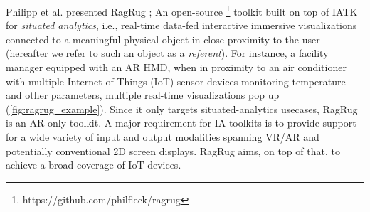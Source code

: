 \documentclass{vgtc}                          %
\begin{document}
Philipp et al. presented RagRug \cite{ragrug_toolkit}; An open-source
\footnote{https://github.com/philfleck/ragrug} toolkit built on top of IATK
for \textit{situated analytics}, i.e., real-time data-fed interactive immersive
visualizations connected to a meaningful physical object in close proximity to
the user (hereafter we refer to such an object as a \textit{referent}).
For instance, a facility manager equipped with an AR HMD, when in proximity to
an air conditioner with multiple Internet-of-Things (IoT)
sensor devices monitoring temperature and other parameters, multiple real-time
visualizations pop up (\cref{fig:ragrug_example}). Since it only targets
situated-analytics usecases, RagRug is an AR-only toolkit.
A major requirement for IA toolkits is to provide support for a wide variety of
input and output modalities spanning VR/AR and potentially conventional 2D
screen displays. RagRug aims, on top of that, to achieve a broad coverage of
IoT devices.

\smallskip
\end{document}
